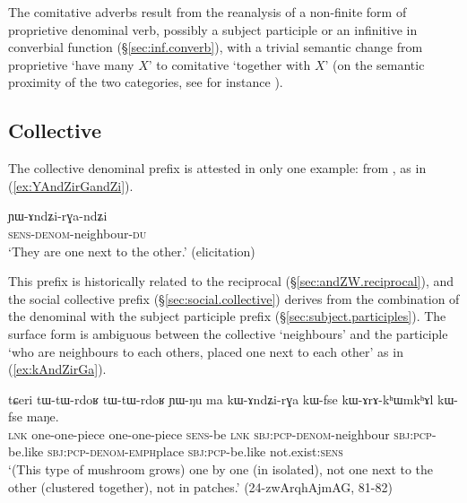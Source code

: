 The comitative adverbs result from the reanalysis of a non-finite form of proprietive  denominal verb, possibly a subject participle or an infinitive in converbial function (§\ref{sec:inf.converb}), with a trivial semantic change from proprietive `have many $X$' to comitative `together with $X$' (on the semantic proximity of the two categories, see for instance \citealt{sutton76having, patz91djabugay, stassen00and, stolz06comitative, arkhipov09comitative}).
 

\subsection{Collective  } \label{sec:denom.andZi}
The  collective denominal prefix is attested in only one example: 
 from , as in (\ref{ex:YAndZirGandZi}). 

\begin{exe}
\ex \label{ex:YAndZirGandZi}
\gll ɲɯ-ɤndʑi-rɣa-ndʑi \\
\textsc{sens}-\textsc{denom}-neighbour-\textsc{du} \\
\glt `They are one next to the other.' (elicitation)
\end{exe}

This prefix is historically related to the  reciprocal (§\ref{sec:andZW.reciprocal}), and the social collective  prefix (§\ref{sec:social.collective}) derives from the combination of the denominal  with the  subject participle prefix (§\ref{sec:subject.participles}). The surface form  is ambiguous between the collective `neighbours' and the participle `who are neighbours to each others, placed one next to each other' as in (\ref{ex:kAndZirGa}).


\begin{exe}
\ex \label{ex:kAndZirGa}
\gll  tɕeri tɯ-tɯ-rdoʁ tɯ-tɯ-rdoʁ ɲɯ-ŋu ma kɯ-ɤndʑi-rɣa kɯ-fse kɯ-ɤrɤ-kʰɯm\redp{}kʰɤl kɯ-fse maŋe. \\
\textsc{lnk} one-one-piece one-one-piece  \textsc{sens}-be \textsc{lnk} \textsc{sbj}:\textsc{pcp}-\textsc{denom}-neighbour \textsc{sbj}:\textsc{pcp}-be.like \textsc{sbj}:\textsc{pcp}-\textsc{denom}-\textsc{emph}\redp{}place  \textsc{sbj}:\textsc{pcp}-be.like not.exist:\textsc{sens} \\
\glt `(This type of mushroom grows) one by one (in isolated), not one next to the other (clustered together), not in patches.' (24-zwArqhAjmAG, 81-82)
\end{exe}

